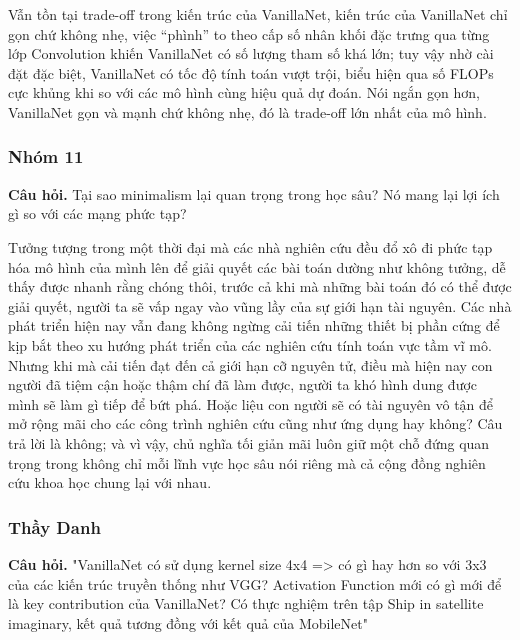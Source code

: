 \documentclass[a4paper,12pt]{report}
\begin{document}
Vẫn tồn tại trade-off trong kiến trúc của VanillaNet, kiến trúc của VanillaNet chỉ gọn chứ không nhẹ, việc ``phình'' to theo cấp số nhân khối đặc trưng qua từng lớp Convolution khiến VanillaNet có số lượng tham số khá lớn; tuy vậy nhờ cài đặt đặc biệt, VanillaNet có tốc độ tính toán vượt trội, biểu hiện qua số FLOPs cực khủng khi so với các mô hình cùng hiệu quả dự đoán. Nói ngắn gọn hơn, VanillaNet gọn và mạnh chứ không nhẹ, đó là trade-off lớn nhất của mô hình.

\subsubsection*{Nhóm 11} 
\vspace*{-5mm}
\textbf{Câu hỏi.} Tại sao minimalism lại quan trọng trong học sâu? Nó mang lại lợi ích gì so với các mạng phức tạp?

Tưởng tượng trong một thời đại mà các nhà nghiên cứu đều đổ xô đi phức tạp hóa mô hình của mình lên để giải quyết các bài toán dường như không tưởng, dễ thấy được nhanh rằng chóng thôi, trước cả khi mà những bài toán đó có thể được giải quyết, người ta sẽ vấp ngay vào vũng lầy của sự giới hạn tài nguyên. Các nhà phát triển hiện nay vẫn đang không ngừng cải tiến những thiết bị phần cứng để kịp bắt theo xu hướng phát triển của các nghiên cứu tính toán vực tầm vĩ mô. Nhưng khi mà cải tiến đạt đến cả giới hạn cỡ nguyên tử, điều mà hiện nay con người đã tiệm cận hoặc thậm chí đã làm được, người ta khó hình dung được mình sẽ làm gì tiếp để bứt phá. Hoặc liệu con người sẽ có tài nguyên vô tận để mở rộng mãi cho các công trình nghiên cứu cũng như ứng dụng hay không? Câu trả lời là không; và vì vậy, chủ nghĩa tối giản mãi luôn giữ một chỗ đứng quan trọng trong không chỉ mỗi lĩnh vực học sâu nói riêng mà cả cộng đồng nghiên cứu khoa học chung lại với nhau.

\subsubsection*{Thầy Danh} 
\vspace*{-5mm}
\textbf{Câu hỏi.} "VanillaNet có sử dụng kernel size 4x4 => có gì hay hơn so với 3x3 của các kiến trúc truyền thống như VGG? Activation Function mới có gì mới để là key contribution của VanillaNet?
Có thực nghiệm trên tập Ship in satellite imaginary, kết quả tương đồng với kết quả của MobileNet"
\end{document}
